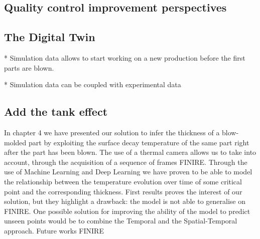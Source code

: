 \subsection{Quality control improvement perspectives}

\subsection{The Digital Twin}
* Simulation data allows to start working on a new production before the first parts are blown.

* Simulation data can be coupled with experimental data

\subsection{Add the tank effect}

In chapter 4 we have presented our solution to infer the thickness of a blow-molded part by exploiting the surface decay temperature of the same part right after the part has been blown. The use of a thermal camera allows us to take into account, through the acquisition of a sequence of frames FINIRE.
Through the use of Machine Learning and Deep Learning we have proven to be able to model the relationship between the temperature evolution over time of some critical point and the corresponding thickness. First results proves the interest of our solution, but they highlight a drawback: the model is not able to generalise on FINIRE. One possible solution for improving the ability of the model to predict unseen points would be to combine the Temporal and the Spatial-Temporal approach. Future works FINIRE 






